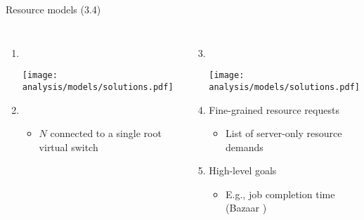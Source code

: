 \begin{frame}{Resource models (3.4)}
    \begin{columns}[T,onlytextwidth]
        \begin{enumerate}
            \item {}\\
            \vspace{1mm}
            \begin{center}
                \texttt{[image: analysis/models/solutions.pdf]}
            \end{center}
            \item {}
            \begin{itemize}
                \item $N$  connected to a single root virtual switch
            \end{itemize}
        \end{enumerate}
        \begin{enumerate}
            \setcounter{enumi}{2}
            \item {}\\
            \begin{center}
                \texttt{[image: analysis/models/solutions.pdf]}
            \end{center}
            \item Fine-grained resource requests
            \begin{itemize}
                \item List of server-only resource demands
            \end{itemize}
            \item High-level goals
            \begin{itemize}
                \item E.g., job completion time (Bazaar \cite{bazaar})
            \end{itemize}
        \end{enumerate}
    \end{columns}
\end{frame}

